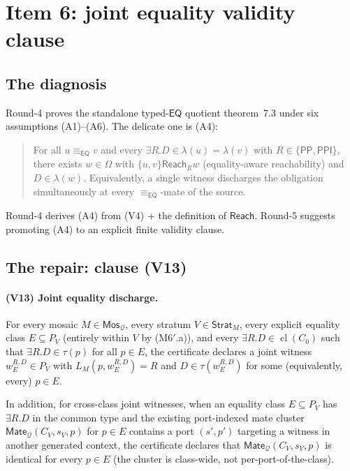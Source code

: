 \documentclass[11pt]{article}
\theoremstyle{definition}
\theoremstyle{remark}
\newcommand{\PP}{\mathsf{PP}}
\newcommand{\PPI}{\mathsf{PPI}}
\newcommand{\EQ}{\mathsf{EQ}}
\newcommand{\Mos}{\mathsf{Mos}}
\newcommand{\Mate}{\mathsf{Mate}}
\newcommand{\Reach}{\mathsf{Reach}}
\newcommand{\Q}{\mathcal{Q}}
\newcommand{\Cl}{\operatorname{cl}}
\newcommand{\eqc}{\equiv_{\EQ}}
\newcommand{\Stratum}{\mathsf{Strat}}
\begin{document}
\section{Item 6: joint equality validity clause}
\label{sec:item6}

\subsection{The diagnosis}

Round-4 \cite{GPT55Repaired} proves the standalone typed-$\EQ$
quotient theorem~7.3 under six assumptions (A1)--(A6).  The
delicate one is (A4):
\begin{quote}
For all $u\eqc v$ and every $\exists R.D\in\lambda(u)=\lambda(v)$
with $R\in\{\PP,\PPI\}$, there exists $w\in\Omega$ with
$\{u,v\}\Reach_R w$ (equality-aware reachability) and
$D\in\lambda(w)$.  Equivalently, a single witness discharges the
obligation simultaneously at every $\eqc$-mate of the source.
\end{quote}
Round-4 derives (A4) from (V4) + the definition of $\Reach$.
Round-5 \cite{GPT55Round5Review} suggests promoting (A4) to an
explicit finite validity clause.

\subsection{The repair: clause (V13)}

\paragraph{(V13) Joint equality discharge.}
For every mosaic $M\in\Mos_\Q$, every stratum $V\in\Stratum_M$,
every explicit equality class $E\subseteq P_V$ (entirely within $V$
by (M6$'$.a)), and every $\exists R.D\in\Cl(C_0)$ such that
$\exists R.D\in\tau(p)$ for all $p\in E$, the certificate declares a
joint witness $w_E^{R,D}\in P_V$ with $L_M(p,w_E^{R,D})=R$ and
$D\in\tau(w_E^{R,D})$ for some (equivalently, every) $p\in E$.

In addition, for cross-class joint witnesses, when an equality
class $E\subseteq P_V$ has $\exists R.D$ in the common type and
the existing port-indexed mate cluster $\Mate_\Q(C_V,s_V,p)$ for
$p\in E$ contains a port $(s',p')$ targeting a witness in
another generated context, the certificate declares that
$\Mate_\Q(C_V,s_V,p)$ is identical for every $p\in E$ (the cluster
is class-wide, not per-port-of-the-class).
\end{document}

